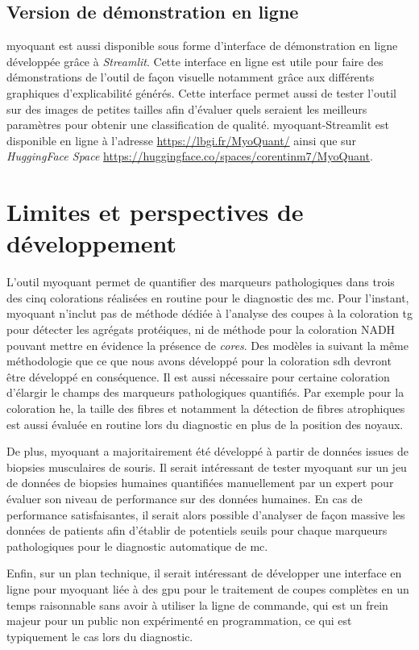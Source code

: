 \subsection{Version de démonstration en ligne}
\gls{myoquant} est aussi disponible sous forme d'interface de démonstration en ligne développée grâce à \textit{Streamlit}. Cette interface en ligne est utile pour faire des démonstrations de l'outil de façon visuelle notamment grâce aux différents graphiques d'explicabilité générés. Cette interface permet aussi de tester l'outil sur des images de petites tailles afin d'évaluer quels seraient les meilleurs paramètres pour obtenir une classification de qualité. \gls{myoquant}-Streamlit est disponible en ligne à l'adresse \href{https://lbgi.fr/MyoQuant/}{https://lbgi.fr/MyoQuant/} ainsi que sur \textit{HuggingFace Space} \href{https://huggingface.co/spaces/corentinm7/MyoQuant}{https://huggingface.co/spaces/corentinm7/MyoQuant}.

\section{Limites et perspectives de développement}
L'outil \gls{myoquant} permet de quantifier des marqueurs pathologiques dans trois des cinq colorations réalisées en routine pour le diagnostic des \gls{mc}. Pour l'instant, \gls{myoquant} n'inclut pas de méthode dédiée à l'analyse des coupes à la coloration \gls{tg} pour détecter les agrégats protéiques, ni de méthode pour la coloration NADH pouvant mettre en évidence la présence de \textit{cores}. Des modèles \gls{ia} suivant la même méthodologie que ce que nous avons développé pour la coloration \gls{sdh} devront être développé en conséquence. Il est aussi nécessaire pour certaine coloration d'élargir le champs des marqueurs pathologiques quantifiés. Par exemple pour la coloration \gls{he}, la taille des fibres et notamment la détection de fibres atrophiques est aussi évaluée en routine lors du diagnostic en plus de la position des noyaux.

De plus, \gls{myoquant} a majoritairement été développé à partir de données issues de biopsies musculaires de souris. Il serait intéressant de tester \gls{myoquant} sur un jeu de données de biopsies humaines quantifiées manuellement par un expert pour évaluer son niveau de performance sur des données humaines. En cas de performance satisfaisantes, il serait alors possible d'analyser de façon massive les données de patients afin d'établir de potentiels seuils pour chaque marqueurs pathologiques pour le diagnostic automatique de \gls{mc}.

 Enfin, sur un plan technique, il serait intéressant de développer une interface en ligne pour \gls{myoquant} liée à des \gls{gpu} pour le traitement de coupes complètes en un temps raisonnable sans avoir à utiliser la ligne de commande, qui est un frein majeur pour un public non expérimenté en programmation, ce qui est typiquement le cas lors du diagnostic.